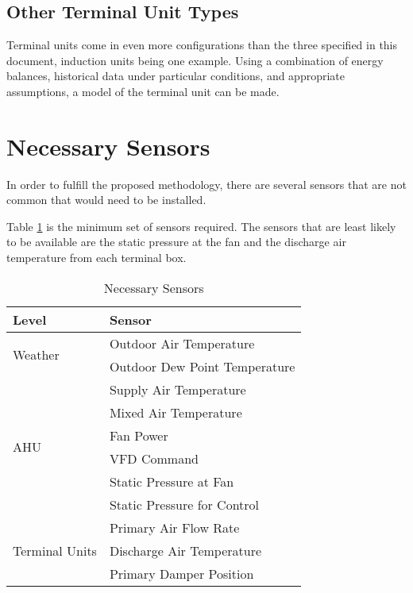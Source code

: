 \subsection{Other Terminal Unit Types}

Terminal units come in even more configurations than the three specified in this document, induction units being one example. Using a combination of energy balances, historical data under particular conditions, and appropriate assumptions, a model of the terminal unit can be made. 

\section{Necessary Sensors}

In order to fulfill the proposed methodology, there are several sensors that are not common that would need to be installed. 

Table \ref{tab:NecessarySensors} is the minimum set of sensors required. The sensors that are least likely to be available are the static pressure at the fan and the discharge air temperature from each terminal box.

\begin{table}
\centering
\begin{tabular}{l l}
\toprule

Level & Sensor \\
\midrule\midrule
\multirow{2}{*}{Weather} & Outdoor Air Temperature \\
 & Outdoor Dew Point Temperature \\
 
 \midrule
 
 \multirow{6}{*}{AHU} & Supply Air Temperature \\
 & Mixed Air Temperature \\
 & Fan Power \\
 & VFD Command \\
 & Static Pressure at Fan \\
 & Static Pressure for Control \\
 
 
\midrule

\multirow{4}{*}{Terminal Units} & Primary Air Flow Rate \\
& Discharge Air Temperature \\
& Primary Damper Position \\

\bottomrule

\end{tabular}
\caption{Necessary Sensors}
\label{tab:NecessarySensors}
\end{table}


